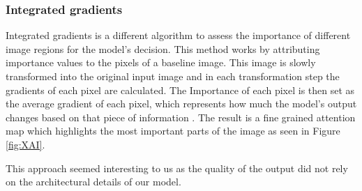 \subsubsection{Integrated gradients}

Integrated gradients is a different algorithm to assess the importance of different image regions for the model's decision. This method works by attributing importance values 
to the pixels of a baseline image. This image is slowly transformed into the original input image and in each transformation step the gradients of each pixel are calculated. The 
Importance of each pixel is then set as the average gradient of each pixel, which represents how much the model's output changes based on that piece of information \cite{DBLP:journals/corr/SundararajanTY17}.
The result is a fine grained attention map which highlights the most important parts of the image as seen in Figure \ref{fig:XAI}.

This approach seemed interesting to us as the quality of the output did not rely on the architectural details of our model.
